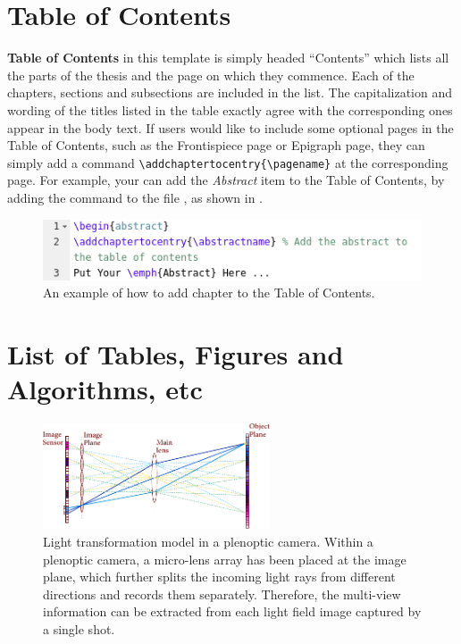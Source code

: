 \section{Table of Contents}
\label{chap2:sec6:table_of_contents}
\textbf{Table of Contents} in this template is simply headed ``Contents'' which lists all the parts of the thesis and the page on which they commence. Each of the chapters, sections and subsections are included in the list. The capitalization and wording of the titles listed in the table exactly agree with the corresponding ones appear in the body text. If users would like to include some optional pages in the Table of Contents, such as the Frontispiece page or Epigraph page, they can simply add a command \verb|\addchaptertocentry{\pagename}| at the corresponding page. For example, your can add the \textit{Abstract} item to the Table of Contents, by adding the command to the file , as shown in .
\begin{figure}[!h]
    \centering
    \includegraphics[width=.8\textwidth]{Figures/Chapter2/add_command_example.png}
    \caption{An example of how to add chapter to the Table of Contents.}\label{fig:chap2:example_add_command}
\end{figure}


\section{List of Tables, Figures and Algorithms, etc}
\label{chap2:sec7:list_of_tables_figures_and_algorithms_etc}
\begin{figure}[t]
    \centering
    \includegraphics[width=0.6\textwidth]{Figures/Chapter2/photo_consistency.pdf}
    \caption{Light transformation model in a plenoptic camera. Within a plenoptic camera, a micro-lens array has been placed at the image plane, which further splits the incoming light rays from different directions and records them separately. Therefore, the multi-view information can be extracted from each light field image captured by a single shot.}
    \label{fig:photo_consistency}
\end{figure}

